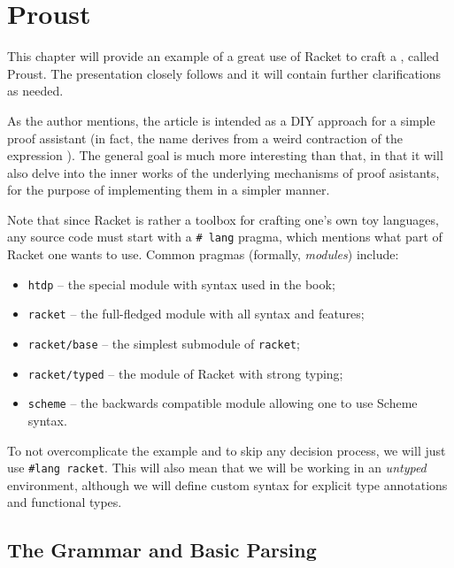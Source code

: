 \chapter{Proust}
\label{ch:proust}

This chapter will provide an example of a great use of Racket to craft
a , called Proust. The presentation closely
follows \cite{proust} and it will contain further clarifications as
needed.

As the author mentions, the article is intended as a DIY approach
for a simple proof assistant (in fact, the name derives from a weird
contraction of the expression ). The general goal
is much more interesting than that, in that it will also delve into the
inner works of the underlying mechanisms of proof asistants, for the
purpose of implementing them in a simpler manner.

Note that since Racket is rather a toolbox for crafting one's own toy
languages, any source code must start with a \texttt{\#\!\!\! lang} pragma,
which mentions what part of Racket one wants to use. Common pragmas
(formally, \emph{modules}) include:
\begin{itemize}
\item \texttt{htdp} -- the special module with syntax used in the
  \cite{htdp} book;
\item \texttt{racket} -- the full-fledged module with all syntax and features;
\item \texttt{racket/base} -- the simplest submodule of \texttt{racket};
\item \texttt{racket/typed} -- the module of Racket with strong typing;
\item \texttt{scheme} -- the backwards compatible module allowing one
  to use Scheme syntax.
\end{itemize}

To not overcomplicate the example and to skip any decision process,
we will just use \texttt{\#lang racket}. This will also mean that
we will be working in an \emph{untyped} environment, although we will
define custom syntax for explicit type annotations and functional types.

\section{The Grammar and Basic Parsing}

